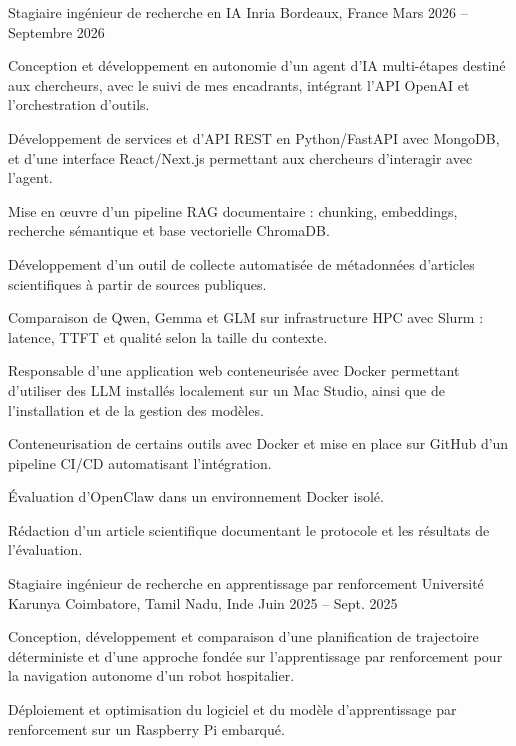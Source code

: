 
\begin{cventries}
  \cventry
    {Stagiaire ingénieur de recherche en IA}
    {Inria}
    {Bordeaux, France}
    {Mars 2026 -- Septembre 2026}
    {
      \begin{cvitems}
        \item {Conception et développement en autonomie d’un agent d’IA multi-étapes destiné aux chercheurs, avec le suivi de mes encadrants, intégrant l’API OpenAI et l’orchestration d’outils.}
        \item {Développement de services et d’API REST en Python/FastAPI avec MongoDB, et d’une interface React/Next.js permettant aux chercheurs d’interagir avec l’agent.}
        \item {Mise en œuvre d’un pipeline RAG documentaire : chunking, embeddings, recherche sémantique et base vectorielle ChromaDB.}
        \item {Développement d’un outil de collecte automatisée de métadonnées d’articles scientifiques à partir de sources publiques.}
        \item {Comparaison de Qwen, Gemma et GLM sur infrastructure HPC avec Slurm : latence, TTFT et qualité selon la taille du contexte.}
        \item {Responsable d’une application web conteneurisée avec Docker permettant d’utiliser des LLM installés localement sur un Mac Studio, ainsi que de l’installation et de la gestion des modèles.}
        \item {Conteneurisation de certains outils avec Docker et mise en place sur GitHub d’un pipeline CI/CD automatisant l’intégration.}
        \item {Évaluation d’OpenClaw dans un environnement Docker isolé.}
        \item {Rédaction d’un article scientifique documentant le protocole et les résultats de l’évaluation.}
      \end{cvitems}
    }

  \cventry
    {Stagiaire ingénieur de recherche en apprentissage par renforcement}
    {Université Karunya}
    {Coimbatore, Tamil Nadu, Inde}
    {Juin 2025 -- Sept. 2025}
    {
      \begin{cvitems}
        \item {Conception, développement et comparaison d’une planification de trajectoire déterministe et d’une approche fondée sur l’apprentissage par renforcement pour la navigation autonome d’un robot hospitalier.}
        \item {Déploiement et optimisation du logiciel et du modèle d’apprentissage par renforcement sur un Raspberry Pi embarqué.}
      \end{cvitems}
    }
\end{cventries}
